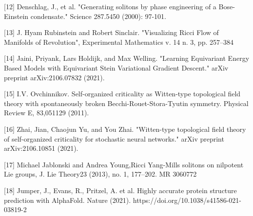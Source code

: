 \documentclass{article}
\begin{document}
[12] Denschlag, J., et al. "Generating solitons by phase engineering of a Bose-Einstein condensate." Science 287.5450 (2000): 97-101.

[13] J. Hyam Rubinstein and Robert Sinclair. "Visualizing Ricci Flow of Manifolds of Revolution", Experimental Mathematics v. 14 n. 3, pp. 257–384

[14] Jaini, Priyank, Lars Holdijk, and Max Welling. "Learning Equivariant Energy Based Models with Equivariant Stein Variational Gradient Descent." arXiv preprint arXiv:2106.07832 (2021).

[15] I.V. Ovchinnikov. Self-organized criticality as Witten-type topological field theory with spontaneously
broken Becchi-Rouet-Stora-Tyutin symmetry. Physical Review E, 83,051129 (2011).

[16] Zhai, Jian, Chaojun Yu, and You Zhai. "Witten-type topological field theory of self-organized criticality for stochastic neural networks." arXiv preprint arXiv:2106.10851 (2021).

[17] Michael Jablonski and Andrea Young,Ricci Yang-Mills solitons on nilpotent Lie groups, J. Lie Theory23 (2013), no. 1, 177–202. MR 3060772


[18] Jumper, J., Evans, R., Pritzel, A. et al. Highly accurate protein structure prediction with AlphaFold. Nature (2021). https://doi.org/10.1038/s41586-021-03819-2





\end{document}
